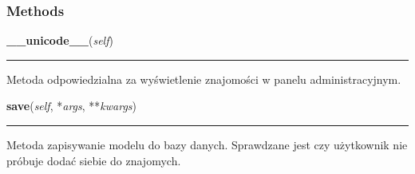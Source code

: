   \subsubsection{Methods}

    \label{ass8_portal:friends:models:UserLink:__unicode__}

    \vspace{0.5ex}

\hspace{.8\funcindent}\begin{boxedminipage}{\funcwidth}

    \raggedright \textbf{\_\_unicode\_\_}(\textit{self})

    \vspace{-1.5ex}

    \rule{\textwidth}{0.5\fboxrule}
\setlength{\parskip}{2ex}
    Metoda odpowiedzialna za wyświetlenie znajomości w panelu 
    administracyjnym.

\setlength{\parskip}{1ex}
    \end{boxedminipage}

    \label{ass8_portal:friends:models:UserLink:save}

    \vspace{0.5ex}

\hspace{.8\funcindent}\begin{boxedminipage}{\funcwidth}

    \raggedright \textbf{save}(\textit{self}, *\textit{args}, **\textit{kwargs})

    \vspace{-1.5ex}

    \rule{\textwidth}{0.5\fboxrule}
\setlength{\parskip}{2ex}
    Metoda zapisywanie modelu do bazy danych. Sprawdzane jest czy 
    użytkownik nie próbuje dodać siebie do znajomych.

\setlength{\parskip}{1ex}
    \end{boxedminipage}



